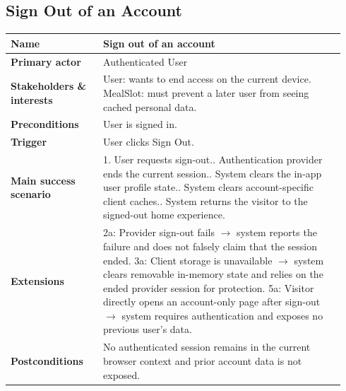 \documentclass[sigconf]{acmart}
\begin{document}
\subsection*{Sign Out of an Account}
{\footnotesize
\begin{supertabular}{@{}p{0.26\linewidth}p{0.68\linewidth}@{}}
\textbf{Name} & Sign out of an account \\
\hline
\textbf{Primary actor} & Authenticated User \\
\hline
\textbf{Stakeholders \& interests} & User: wants to end access on the current device. MealSlot: must prevent a later user from seeing cached personal data. \\
\hline
\textbf{Preconditions} & User is signed in. \\
\hline
\textbf{Trigger} & User clicks Sign Out. \\
\hline
\textbf{Main success scenario} & 1. User requests sign-out.. Authentication provider ends the current session.. System clears the in-app user profile state.. System clears account-specific client caches.. System returns the visitor to the signed-out home experience. \\
\hline
\textbf{Extensions} & 2a: Provider sign-out fails $\rightarrow$ system reports the failure and does not falsely claim that the session ended.\newline
3a: Client storage is unavailable $\rightarrow$ system clears removable in-memory state and relies on the ended provider session for protection.\newline
5a: Visitor directly opens an account-only page after sign-out $\rightarrow$ system requires authentication and exposes no previous user's data. \\
\hline
\textbf{Postconditions} & No authenticated session remains in the current browser context and prior account data is not exposed. \\
\end{supertabular}
}
\end{document}
